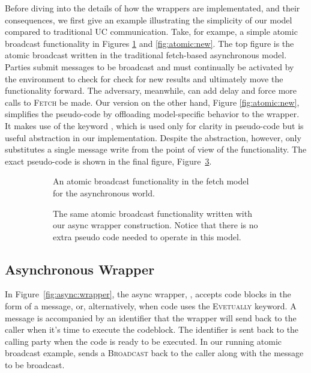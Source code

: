 Before diving into the details of how the wrappers are implementated, and their consequences, we first give an example illustrating the simplicity of our model compared to traditional UC communication.
Take, for exampe, a simple atomic broadcast functionality in Figures \ref{fig:atomic:old} and \ref{fig:atomic:new}. 
The top figure is the atomic broadcast written in the traditional fetch-based asynchronous model.
Parties submit messages to be broadcast and must continually be activated by the environment to check for check for new results and ultimately move the functionality forward.
The adversary, meanwhile, can add delay and force more calls to \textsc{Fetch} be made.
Our version on the other hand, Figure \ref{fig:atomic:new}, simplifies the pseudo-code by offloading model-specific behavior to the wrapper.
It makes use of the keyword \Eventually, which is used only for clarity in pseudo-code but is useful abstraction in our implementation.
Despite the abstraction, however, \Eventually only substitutes a single message write from the point of view of the functionality.
The exact pseudo-code is shown in the final figure, Figure~\ref{fig:atomic:real}.

\begin{figure}[h]
\begin{subfigure}{\columnwidth}
	
	\caption{An atomic broadcast functionality in the fetch model for the asynchronous world.}
	\label{fig:atomic:old}
\end{subfigure}
\begin{subfigure}{\columnwidth}
	
	\caption{The same atomic broadcast functionality written with our async wrapper construction. Notice that there is no extra pseudo code needed to operate in this model.}
\end{subfigure}
\begin{subfigure}{\columnwidth}
	
	\label{fig:atomic:real}
\end{subfigure}
\end{figure}


\subsection{Asynchronous Wrapper}
In Figure~\ref{fig:async:wrapper}, the async wrapper, \Wasync, accepts code blocks in the form of a  message, or, alternatively, when code uses the \textsc{Evetually} keyword.
A  message is accompanied by an identifier that the wrapper will send back to the caller when it's time to execute the codeblock.
The identifier is sent back to the calling party when the code is ready to be executed. 
In our running atomic broadcast example, \Wasync sends a \textsc{Broadcast} back to the caller along with the message to be broadcast.

